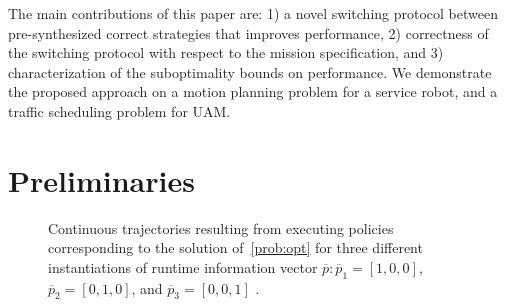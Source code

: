 The main contributions of this paper are: 1) a novel switching protocol between pre-synthesized correct strategies that improves performance, 2) correctness of the switching protocol with respect to the mission specification, and 3) characterization of the suboptimality bounds on performance. We demonstrate the proposed approach on a motion planning problem for a service robot, and a traffic scheduling problem for UAM. 


\section{Preliminaries}\label{sec_prel}

\begin{figure}[t!]
\centering
    \caption{Continuous trajectories resulting from executing policies corresponding to the solution of~\eqref{prob:opt} for three different instantiations of runtime information vector $\overline{p} \colon \overline{p}_1 = [1,0,0]$, $\overline{p}_2 = [0,1,0]$, and $\overline{p}_3 = [0,0,1]$ .}\label{fig:trivialtrajs}
\end{figure}

